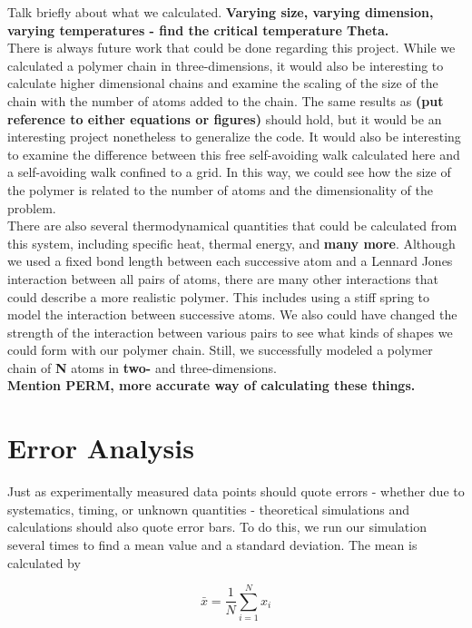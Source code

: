\documentclass{article}
\begin{document}
\begin{multicols}{2}
Talk briefly about what we calculated.  \textbf{Varying size, varying dimension, varying temperatures - find the critical temperature Theta.}\\

There is always future work that could be done regarding this project.  While we calculated a polymer chain in three-dimensions, it would also be interesting to calculate higher dimensional chains and examine the scaling of the size of the chain with the number of atoms added to the chain.  The same results as \textbf{(put reference to either equations or figures)} should hold, but it would be an interesting project nonetheless to generalize the code.  It would also be interesting to examine the difference between this free self-avoiding walk calculated here and a self-avoiding walk confined to a grid.  In this way, we could see how the size of the polymer is related to the number of atoms and the dimensionality of the problem.  \\

There are also several thermodynamical quantities that could be calculated from this system, including specific heat, thermal energy, and \textbf{many more}.  Although we used a fixed bond length between each successive atom and a Lennard Jones interaction between all pairs of atoms, there are many other interactions that could describe a more realistic polymer.  This includes using a stiff spring to model the interaction between successive atoms.  We also could have changed the strength of the interaction between various pairs to see what kinds of shapes we could form with our polymer chain.  Still, we successfully modeled a polymer chain of \textbf{N} atoms in \textbf{two-} and three-dimensions.  \\

\textbf{Mention PERM, more accurate way of calculating these things.}

\appendix

\section{Error Analysis}

Just as experimentally measured data points should quote errors - whether due to systematics, timing, or unknown quantities - theoretical simulations and calculations should also quote error bars.  To do this, we run our simulation several times to find a mean value and a standard deviation.  The mean is calculated by

\begin{equation}
\bar x = \frac{1}{N} \sum \limits _{i=1}^N x_i
\end{equation}


\end{multicols}
\end{document}
